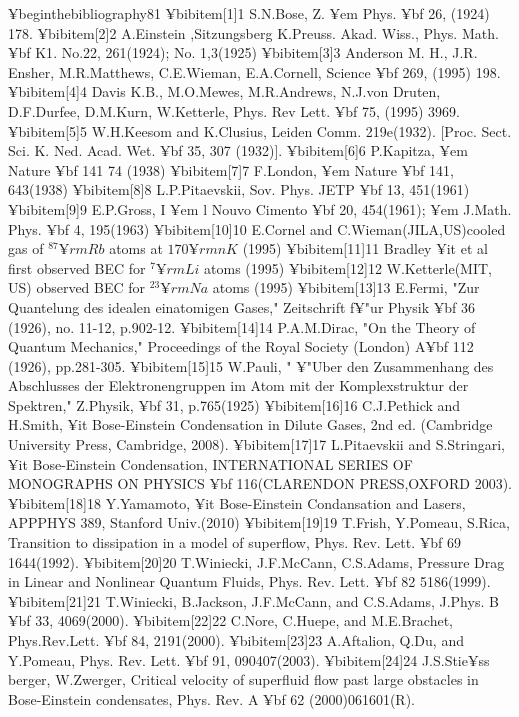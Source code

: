 {{{{{¥begin{thebibliography}{81}
¥bibitem[1]{1} S.N.Bose, Z. {¥em Phys.} {¥bf 26}, (1924) 178.
¥bibitem[2]{2} A.Einstein ,Sitzungsberg K.Preuss. Akad. Wiss., Phys. Math. {¥bf K1}. No.22, 261(1924); No. 1,3(1925)
¥bibitem[3]{3} Anderson M. H., J.R. Ensher, M.R.Matthews, C.E.Wieman, E.A.Cornell, Science {¥bf 269}, (1995) 198.
¥bibitem[4]{4} Davis K.B., M.O.Mewes, M.R.Andrews, N.J.von Druten, D.F.Durfee, D.M.Kurn, W.Ketterle, Phys. Rev Lett. {¥bf 75}, (1995) 3969.
¥bibitem[5]{5} W.H.Keesom and K.Clusius, Leiden Comm. 219e(1932). [Proc. Sect. Sci. K. Ned. Acad. Wet. {¥bf 35}, 307 (1932)].
¥bibitem[6]{6} P.Kapitza, {¥em Nature} {¥bf 141} 74 (1938)
¥bibitem[7]{7} F.London, {¥em Nature} {¥bf 141}, 643(1938)
¥bibitem[8]{8} L.P.Pitaevskii, Sov. Phys. JETP {¥bf 13}, 451(1961)
¥bibitem[9]{9} E.P.Gross, I {¥em l Nouvo Cimento} {¥bf 20}, 454(1961); {¥em J.Math. Phys.} {¥bf 4}, 195(1963)
¥bibitem[10]{10} E.Cornel and C.Wieman(JILA,US)cooled gas of $^{87} {¥rm Rb}$ atoms at $170 {¥rm nK}$ (1995)
¥bibitem[11]{11} Bradley {¥it et al} first observed BEC for $^{7} {¥rm Li}$ atoms (1995)
¥bibitem[12]{12} W.Ketterle(MIT, US) observed BEC for $^{23} {¥rm Na}$ atoms (1995)
¥bibitem[13]{13} E.Fermi, "Zur Quantelung des idealen einatomigen Gases," Zeitschrift f¥"{u}r Physik {¥bf 36} (1926), no. 11-12, p.902-12.
¥bibitem[14]{14} P.A.M.Dirac, "On the Theory of Quantum Mechanics," Proceedings of the Royal Society (London) A{¥bf 112} (1926), pp.281-305.
¥bibitem[15]{15} W.Pauli, " ¥"{U}ber den Zusammenhang des Abschlusses der Elektronengruppen im Atom mit der Komplexstruktur der Spektren," Z.Physik, {¥bf 31}, p.765(1925)
¥bibitem[16]{16} C.J.Pethick and H.Smith, {¥it Bose-Einstein Condensation in Dilute Gases}, 2nd ed. (Cambridge University Press, Cambridge, 2008).
¥bibitem[17]{17} L.Pitaevskii and S.Stringari, {¥it Bose-Einstein Condensation}, INTERNATIONAL SERIES OF MONOGRAPHS ON PHYSICS {¥bf 116}(CLARENDON PRESS,OXFORD 2003).
¥bibitem[18]{18} Y.Yamamoto, {¥it Bose-Einstein Condansation and Lasers}, APPPHYS 389, Stanford Univ.(2010)
¥bibitem[19]{19} T.Frish, Y.Pomeau, S.Rica, Transition to dissipation in a model of superflow, Phys. Rev. Lett. {¥bf 69} 1644(1992).
¥bibitem[20]{20} T.Winiecki, J.F.McCann, C.S.Adams, Pressure Drag in Linear and Nonlinear Quantum Fluids, Phys. Rev. Lett. {¥bf 82} 5186(1999).
¥bibitem[21]{21} T.Winiecki, B.Jackson, J.F.McCann, and C.S.Adams, J.Phys. B {¥bf 33}, 4069(2000).
¥bibitem[22]{22} C.Nore, C.Huepe, and M.E.Brachet, Phys.Rev.Lett. {¥bf 84}, 2191(2000).
¥bibitem[23]{23} A.Aftalion, Q.Du, and Y.Pomeau, Phys. Rev. Lett. {¥bf 91}, 090407(2003).
¥bibitem[24]{24} J.S.Stie¥ss berger, W.Zwerger, Critical velocity of superfluid flow past large obstacles in Bose-Einstein condensates, Phys. Rev. A {¥bf 62} (2000)061601(R).
}}}}}
